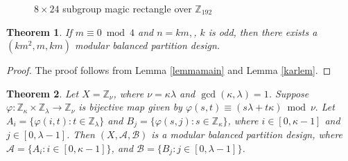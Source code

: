 \documentclass[preprint,11pt]{elsarticle}
\newtheorem{theorem}{Theorem}[section]
\begin{document}
\begin{figure}[h]
 \caption{$8 \times 24$ subgroup magic rectangle over $\mathbb{Z}_{192}$ }
\end{figure}
\begin{theorem}
     If $m\equiv 0\bmod{4}$ and $n=km,$, $k$ is odd, then there exists a $(km^2, m, km)$ modular balanced partition design.
\end{theorem}
\begin{proof}
    The proof follows from Lemma \ref{lemmamain} and Lemma \ref{karlem}. 
\end{proof}
 \begin{theorem}
Let $X=\mathbb{Z}_\nu$, where   $\nu=\kappa\lambda$ and $\gcd(\kappa,\lambda)=1$. Suppose $\varphi:\mathbb{Z}_\kappa\times\mathbb{Z}_\lambda\to\mathbb{Z}_\nu$ is bijective map given by \(\varphi(s,t)\equiv (s\lambda+t\kappa) \bmod{\nu}.
\)
Let $A_i= \{\varphi(i,t): t\in\mathbb{Z}_\lambda\}$ and $B_j = \{\varphi(s,j): s\in\mathbb{Z}_\kappa \}$, where $i\in[0,\kappa-1]$ and $j\in[0,\lambda-1]$. Then $(X,\mathcal{A},\mathcal{B})$ 
is a modular balanced partition design, where $\mathcal{A}=\{A_i: i\in [0, \kappa-1]\}$, and $\mathcal{B}=\{B_j: j\in [0,\lambda-1]\}$.
\end{theorem}
\end{document}
